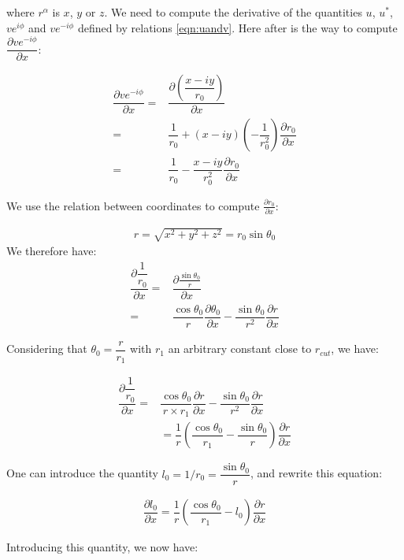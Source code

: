 \documentclass[12pt]{article}
\begin{document}
where $r^\alpha$ is $x$, $y$ or $z$.
We need to compute the derivative of the quantities $u$, $u^\ast$, $v e^{i\phi}$ and $v e^{-i\phi}$ defined by relations \ref{eqn:uandv}. Here after is the way to compute $\dfrac{\partial v e^{-i\phi}}{\partial x}$:

\begin{eqnarray}
\dfrac{\partial v e^{-i\phi}}{\partial x} =& \dfrac{\partial \left(\dfrac{x-i y}{r_0}\right)}{\partial x} \nonumber \\
=& \dfrac{1}{r_0}+\left(x-i y\right)\left(-\dfrac{1}{r_0^2}\right)\dfrac{\partial r_0}{\partial x} \\
=& \dfrac{1}{r_0}-\dfrac{x-i y}{r_0^2}\dfrac{\partial r_0}{\partial x} \nonumber 
\end{eqnarray}

We use the relation between coordinates to compute $\frac{\partial r_0}{\partial x}$:

\begin{eqnarray}
r=\sqrt{x^2+y^2+z^2}=r_0 \sin \theta_0
\end{eqnarray}
We therefore have:
\begin{eqnarray}
\dfrac{\partial \dfrac{1}{r_0}}{\partial x}=&\dfrac{\partial \frac{\sin \theta_0}{r}}{\partial x} \nonumber \\
=&\dfrac{\cos \theta_0}{r} \dfrac{\partial \theta_0}{\partial x} - \dfrac{\sin \theta_0}{r^2}\dfrac{\partial r}{\partial x} 
\end{eqnarray}

Considering that $\theta_0=\dfrac{r}{r_1}$ with $r_1$ an arbitrary constant close to $r_{cut}$, we have:

\begin{eqnarray}
\dfrac{\partial \dfrac{1}{r_0}}{\partial x}=&\dfrac{\cos \theta_0}{r \times r_1} \dfrac{\partial r}{\partial x} - \dfrac{\sin \theta_0}{r^2}\dfrac{\partial r}{\partial x} \nonumber \\
&=\dfrac{1}{r}\left(\dfrac{\cos \theta_0}{r_1}-\dfrac{\sin \theta_0}{r}\right) \dfrac{\partial r}{\partial x}
\end{eqnarray}

One can introduce the quantity $l_0=1/r_0=\dfrac{\sin \theta_0}{r}$, and rewrite this equation:

\begin{eqnarray}
\dfrac{\partial l_0}{\partial x}=\dfrac{1}{r}\left(\dfrac{\cos \theta_0}{r_1}-l_0\right) \dfrac{\partial r}{\partial x}
\end{eqnarray}

Introducing this quantity, we now have:
\end{document}
